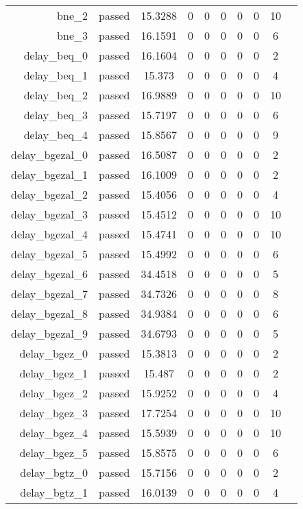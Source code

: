 \begin{longtable}{r|ccccccccc}
    bne\_2 & passed & 15.3288 & 0 & 0 & 0 & 0 & 0 & 10 \\
    bne\_3 & passed & 16.1591 & 0 & 0 & 0 & 0 & 0 & 6 \\
    delay\_beq\_0 & passed & 16.1604 & 0 & 0 & 0 & 0 & 0 & 2 \\
    delay\_beq\_1 & passed & 15.373 & 0 & 0 & 0 & 0 & 0 & 4 \\
    delay\_beq\_2 & passed & 16.9889 & 0 & 0 & 0 & 0 & 0 & 10 \\
    delay\_beq\_3 & passed & 15.7197 & 0 & 0 & 0 & 0 & 0 & 6 \\
    delay\_beq\_4 & passed & 15.8567 & 0 & 0 & 0 & 0 & 0 & 9 \\
    delay\_bgezal\_0 & passed & 16.5087 & 0 & 0 & 0 & 0 & 0 & 2 \\
    delay\_bgezal\_1 & passed & 16.1009 & 0 & 0 & 0 & 0 & 0 & 2 \\
    delay\_bgezal\_2 & passed & 15.4056 & 0 & 0 & 0 & 0 & 0 & 4 \\
    delay\_bgezal\_3 & passed & 15.4512 & 0 & 0 & 0 & 0 & 0 & 10 \\
    delay\_bgezal\_4 & passed & 15.4741 & 0 & 0 & 0 & 0 & 0 & 10 \\
    delay\_bgezal\_5 & passed & 15.4992 & 0 & 0 & 0 & 0 & 0 & 6 \\
    delay\_bgezal\_6 & passed & 34.4518 & 0 & 0 & 0 & 0 & 0 & 5 \\
    delay\_bgezal\_7 & passed & 34.7326 & 0 & 0 & 0 & 0 & 0 & 8 \\
    delay\_bgezal\_8 & passed & 34.9384 & 0 & 0 & 0 & 0 & 0 & 6 \\
    delay\_bgezal\_9 & passed & 34.6793 & 0 & 0 & 0 & 0 & 0 & 5 \\
    delay\_bgez\_0 & passed & 15.3813 & 0 & 0 & 0 & 0 & 0 & 2 \\
    delay\_bgez\_1 & passed & 15.487 & 0 & 0 & 0 & 0 & 0 & 2 \\
    delay\_bgez\_2 & passed & 15.9252 & 0 & 0 & 0 & 0 & 0 & 4 \\
    delay\_bgez\_3 & passed & 17.7254 & 0 & 0 & 0 & 0 & 0 & 10 \\
    delay\_bgez\_4 & passed & 15.5939 & 0 & 0 & 0 & 0 & 0 & 10 \\
    delay\_bgez\_5 & passed & 15.8575 & 0 & 0 & 0 & 0 & 0 & 6 \\
    delay\_bgtz\_0 & passed & 15.7156 & 0 & 0 & 0 & 0 & 0 & 2 \\
    delay\_bgtz\_1 & passed & 16.0139 & 0 & 0 & 0 & 0 & 0 & 4 \\

\end{longtable}
